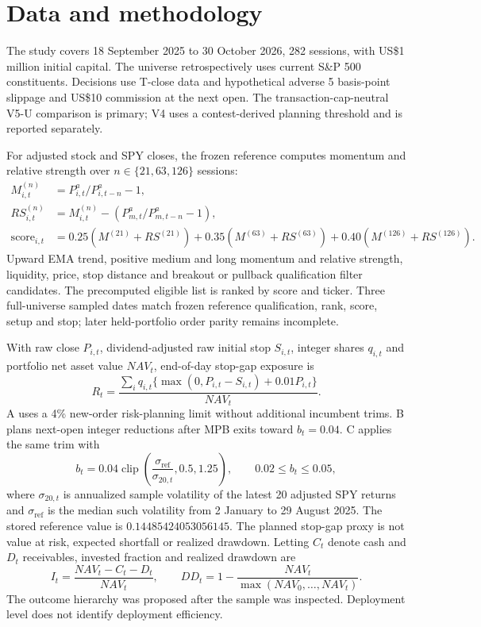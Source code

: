 \documentclass[11pt]{article}
\begin{document}
\section{Data and methodology}
The study covers 18 September 2025 to 30 October 2026, 282 sessions, with US\$1 million initial capital. The universe retrospectively uses current S\&P 500 constituents. Decisions use T-close data and hypothetical adverse 5 basis-point slippage and US\$10 commission at the next open. The transaction-cap-neutral V5-U comparison is primary; V4 uses a contest-derived planning threshold and is reported separately.

For adjusted stock and SPY closes, the frozen reference computes momentum and relative strength over $n\in\{21,63,126\}$ sessions:
\begin{align}
M_{i,t}^{(n)} &= P^a_{i,t}/P^a_{i,t-n}-1,\\
RS_{i,t}^{(n)} &= M_{i,t}^{(n)}-(P^a_{m,t}/P^a_{m,t-n}-1),\\
\mathrm{score}_{i,t} &= 0.25(M^{(21)}+RS^{(21)})+0.35(M^{(63)}+RS^{(63)})+0.40(M^{(126)}+RS^{(126)}).
\end{align}
Upward EMA trend, positive medium and long momentum and relative strength, liquidity, price, stop distance and breakout or pullback qualification filter candidates. The precomputed eligible list is ranked by score and ticker. Three full-universe sampled dates match frozen reference qualification, rank, score, setup and stop; later held-portfolio order parity remains incomplete.

With raw close $P_{i,t}$, dividend-adjusted raw initial stop $S_{i,t}$, integer shares $q_{i,t}$ and portfolio net asset value $NAV_t$, end-of-day stop-gap exposure is
\begin{equation}
R_t=\frac{\sum_i q_{i,t}\{\max(0,P_{i,t}-S_{i,t})+0.01P_{i,t}\}}{NAV_t}.
\end{equation}
A uses a 4\% new-order risk-planning limit without additional incumbent trims. B plans next-open integer reductions after MPB exits toward $b_t=0.04$. C applies the same trim with
\begin{equation}
b_t=0.04\operatorname{clip}\!\left(\frac{\sigma_{\mathrm{ref}}}{\sigma_{20,t}},0.5,1.25\right),\qquad 0.02\le b_t\le0.05,
\end{equation}
where $\sigma_{20,t}$ is annualized sample volatility of the latest 20 adjusted SPY returns and $\sigma_{\mathrm{ref}}$ is the median such volatility from 2 January to 29 August 2025. The stored reference value is $0.14485424053056145$. The planned stop-gap proxy is not value at risk, expected shortfall or realized drawdown. Letting $C_t$ denote cash and $D_t$ receivables, invested fraction and realized drawdown are
\begin{equation}
I_t=\frac{NAV_t-C_t-D_t}{NAV_t},\qquad DD_t=1-\frac{NAV_t}{\max(NAV_0,\ldots,NAV_t)}.
\end{equation}
The outcome hierarchy was proposed after the sample was inspected. Deployment level does not identify deployment efficiency.
\end{document}
